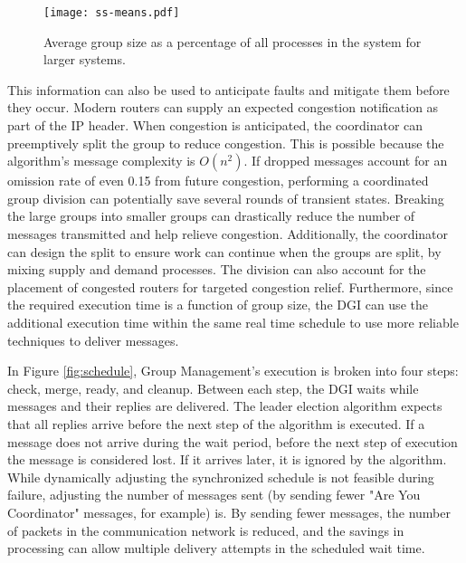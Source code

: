 \begin{figure}
    \centering
    \texttt{[image: ss-means.pdf]}
    \caption{Average group size as a percentage of all processes in the system for larger systems.}
    \label{fig:ss-means}
\end{figure}

This information can also be used to anticipate faults and mitigate them before they occur.
Modern routers can supply an expected congestion notification as part of the IP header\cite{ECN2}.
When congestion is anticipated, the coordinator can preemptively split the group to reduce congestion.
This is possible because the algorithm's message complexity is $O(n^2)$.
If dropped messages account for an omission rate of even 0.15 from future congestion, performing a coordinated group division can potentially save several rounds of transient states.
Breaking the large groups into smaller groups can drastically reduce the number of messages transmitted and help relieve congestion.
Additionally, the coordinator can design the split to ensure work can continue when the groups are split, by mixing supply and demand processes.
The division can also account for the placement of congested routers for targeted congestion relief.
Furthermore, since the required execution time is a function of group size, the DGI can use the additional execution time within the same real time schedule to use more reliable techniques to deliver messages.


In Figure \ref{fig:schedule}, Group Management's execution is broken into four steps: check, merge, ready, and cleanup.
Between each step, the DGI waits while messages and their replies are delivered.
The leader election algorithm expects that all replies arrive before the next step of the algorithm is executed.
If a message does not arrive during the wait period, before the next step of execution the message is considered lost.
If it arrives later, it is ignored by the algorithm.
While dynamically adjusting the synchronized schedule is not feasible during failure, adjusting the number of messages sent (by sending fewer "Are You Coordinator" messages, for example) is.
By sending fewer messages, the number of packets in the communication network is reduced, and the savings in processing can allow multiple delivery attempts in the scheduled wait time.



